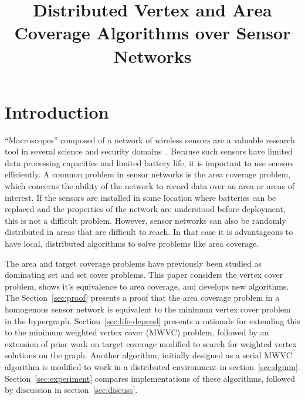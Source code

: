 

\title{Distributed Vertex and Area Coverage Algorithms over Sensor Networks} 

\author{
}

\maketitle

\section{Introduction}
``Macroscopes'' composed of a network of wireless sensors are a valuable research tool in several science and security domains~\cite{1098925,990703}. Because such sensors have limited data processing capacities and limited battery life, it is important to use sensors efficiently. A common problem in sensor networks is the area coverage problem, which concerns the ability of the network to record data over an area or areas of interest. If the sensors are installed in some location where batteries can be replaced and the properties of the network are understood before deployment, this is not a difficult problem. However, sensor networks can also be randomly distributed in areas that are difficult to reach. In that case it is advantageous to have local, distributed algorithms to solve problems like area coverage.

The area and target coverage problems have previously been studied as dominating set and set cover problems. This paper considers the vertex cover problem, shows it's equivalence to area coverage, and develops new algorithms. The Section~\ref{sec:proof} presents a proof that the area coverage problem in a homogenous sensor network is equivalent to the minimum vertex cover problem in the hypergraph. Section~\ref{sec:life-depend} presents a rationale for extending this to the minimum weighted vertex cover (MWVC) problem, followed by an extension of prior work on target coverage \cite{978-3-540-77220-0_36} modified to search for weighted vertex solutions on the graph. Another algorithm, initially designed as a serial MWVC algorithm\cite{Gonzalez1995129} is modified to work in a distributed environment in section~\ref{sec:dgmm}. Section~\ref{sec:experiment} compares implementations of these algorithms, followed by discussion in section~\ref{sec:discuss}. 

